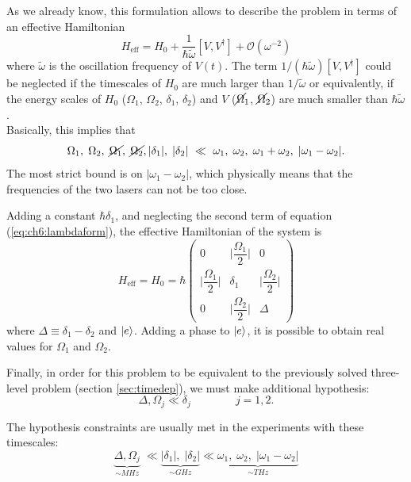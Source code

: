 As we already know, this formulation allows to describe the problem in terms of an effective Hamiltonian
\begin{equation}
H_{\text{eff}} = H_0 + 
\frac{1}{\hbar \tilde\omega}\left[V,V^\dag\right] + \mathcal{O}(\omega^{-2})
\label{eq:ch6:lambdaform}
\end{equation}
where $\tilde{\omega}$ is the oscillation frequency of $V(t)$. The term ${1}/(\hbar {\tilde\omega}) \left[V,V^\dag\right]$ could be neglected if the timescales of $H_0$ are much larger than ${1}/{\tilde\omega}$ or equivalently, if the energy scales of $H_0$ ($\Omega_1$, $\Omega_2$, $\delta_1$, $\delta_2$) and $V$ ($\cancel{\Omega}_1$, $\cancel{\Omega}_2$) are much smaller than $\hbar\tilde\omega$. \\
Basically, this implies that
$$\Omega_1,\; \Omega_2,\; \cancel{\Omega_1},\; \cancel{\Omega_2}, |\delta_1|,\; |\delta_2| ~
\ll ~\omega_1,\; \omega_2,\; \omega_1+\omega_2,\; |\omega_1-\omega_2|.$$
The most strict bound is on $|\omega_1-\omega_2|$, which physically means that the frequencies of the two lasers can not be too close. 

Adding a constant $\hbar\delta_1$, and neglecting the second term of equation (\ref{eq:ch6:lambdaform}), the effective Hamiltonian of the system is
\begin{equation*}
H_{\text{eff}} = H_0 = \hbar \begin{pmatrix}
    0 & \bigg\rvert\dfrac{\Omega_1}{2}\bigg\rvert & 0\\
    \bigg\rvert\dfrac{\Omega_1}{2}\bigg\rvert & \delta_1 & \bigg\rvert\dfrac{\Omega_2}{2}\bigg\rvert\\
    0 & \bigg\rvert\dfrac{\Omega_2}{2}\bigg\rvert & \Delta
\end{pmatrix}
\end{equation*}
where $\Delta \equiv \delta_1 - \delta_2$ and $\ket{e}$. Adding a phase to $\ket{e}$, it is possible to obtain real values for $\Omega_1$ and $\Omega_2$. 

Finally, in order for this problem to be equivalent to the previously solved three-level problem (section \ref{sec:timedep}), we must make additional hypothesis:
$$ \Delta, \Omega_j \ll \delta_j \qquad \qquad j = 1, 2.$$
\begin{tcolorbox} 
The hypothesis constraints are usually met in the experiments with these timescales:
\begin{equation*}
\underbrace{\Delta, \Omega_j}_{\sim MHz} \;
\ll 
\underbrace{|\delta_1|,\;|\delta_2|}_{\sim GHz}
\ll 
\underbrace{\omega_1,\;\omega_2,\;|\omega_1-\omega_2|}_{ \sim THz}
\end{equation*}
\end{tcolorbox}

